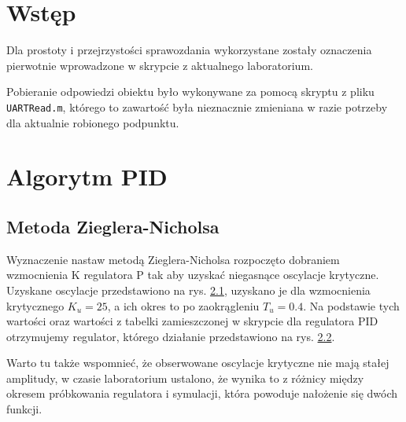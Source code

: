 \chapter{Wstęp}
Dla prostoty i przejrzystości sprawozdania wykorzystane zostały oznaczenia pierwotnie wprowadzone w skrypcie z aktualnego laboratorium\@.

Pobieranie odpowiedzi obiektu było wykonywane za pomocą skryptu z pliku \verb|UARTRead.m|, którego to zawartość była nieznacznie zmieniana w razie potrzeby dla aktualnie robionego podpunktu.

\chapter{Algorytm PID}

\section{Metoda Zieglera-Nicholsa}
Wyznaczenie nastaw metodą Zieglera-Nicholsa rozpoczęto dobraniem wzmocnienia K regulatora P tak aby uzyskać niegasnące oscylacje krytyczne. Uzyskane oscylacje przedstawiono na rys. \ref{R1}, uzyskano je dla wzmocnienia krytycznego $K_u = 25$, a ich okres to po zaokrągleniu $T_u = 0.4$. Na podstawie tych wartości oraz wartości z tabelki zamieszczonej w skrypcie dla regulatora PID otrzymujemy regulator, którego działanie przedstawiono na rys. \ref{R2}.

Warto tu także wspomnieć, że obserwowane oscylacje krytyczne nie mają stałej amplitudy, w czasie laboratorium ustalono, że wynika to z różnicy między okresem próbkowania regulatora i symulacji, która powoduje nałożenie się dwóch funkcji.

\begin{figure}[H]
\centering

\label{R1}
\end{figure}

\begin{figure}[H]
\centering

\label{R2}
\end{figure}

